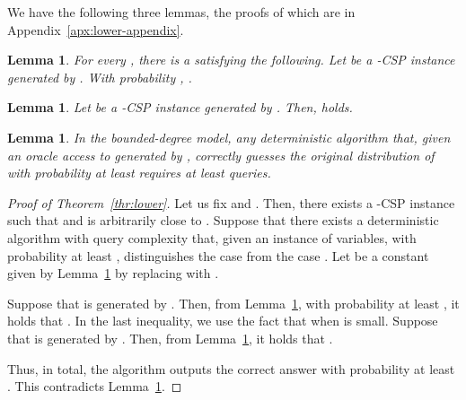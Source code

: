 \documentclass[letterpaper, 11pt]{article}
\newtheorem{lemma}[theorem]{Lemma}
\begin{document}
We have the following three lemmas, 
the proofs of which are in Appendix~\ref{apx:lower-appendix}.
\begin{lemma}\label{lmm:less-than-opt}
  For every , there is a  satisfying the following.
  Let  be a -CSP instance generated by .
  With probability ,
  .
\end{lemma}
\begin{lemma}\label{lmm:more-than-lp}
  Let  be a -CSP instance generated by .
  Then,  holds.
\end{lemma}
\begin{lemma}\label{lmm:distinguish}
  In the bounded-degree model,
  any deterministic algorithm that,
  given an oracle access to  generated by ,
  correctly guesses the original distribution of  with probability at least  requires at least  queries.
\end{lemma}

\begin{proof}[Proof of Theorem~\ref{thr:lower}]
  Let us fix  and .
  Then, there exists a -CSP instance  such that  and  is arbitrarily close to .
  Suppose that there exists a deterministic algorithm  with query complexity  that, 
  given an instance  of  variables,
  with probability at least ,
  distinguishes the case  from the case .
  Let  be a constant given by Lemma~\ref{lmm:less-than-opt} by replacing  with .

  Suppose that  is generated by .
  Then, from Lemma~\ref{lmm:less-than-opt}, 
  with probability at least , 
  it holds that .
  In the last inequality, we use the fact that  when  is small.
  Suppose that  is generated by .
  Then, from Lemma~\ref{lmm:more-than-lp},
  it holds that .

  Thus, in total, the algorithm outputs the correct answer with probability at least
  .
  This contradicts Lemma~\ref{lmm:distinguish}.
\end{proof}

\newpage
\end{document}
